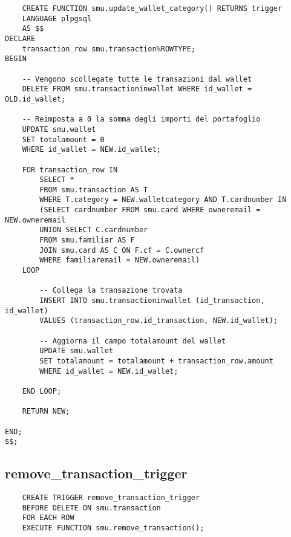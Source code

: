 \begin{lstlisting}
    CREATE FUNCTION smu.update_wallet_category() RETURNS trigger
    LANGUAGE plpgsql
    AS $$
DECLARE
    transaction_row smu.transaction%ROWTYPE;
BEGIN

    -- Vengono scollegate tutte le transazioni dal wallet
    DELETE FROM smu.transactioninwallet WHERE id_wallet = OLD.id_wallet;

    -- Reimposta a 0 la somma degli importi del portafoglio
    UPDATE smu.wallet
    SET totalamount = 0
    WHERE id_wallet = NEW.id_wallet;

    FOR transaction_row IN
        SELECT *
        FROM smu.transaction AS T
        WHERE T.category = NEW.walletcategory AND T.cardnumber IN 
        (SELECT cardnumber FROM smu.card WHERE owneremail = NEW.owneremail
        UNION SELECT C.cardnumber
        FROM smu.familiar AS F
        JOIN smu.card AS C ON F.cf = C.ownercf
        WHERE familiaremail = NEW.owneremail)
    LOOP

        -- Collega la transazione trovata
        INSERT INTO smu.transactioninwallet (id_transaction, id_wallet)
        VALUES (transaction_row.id_transaction, NEW.id_wallet);

        -- Aggiorna il campo totalamount del wallet
        UPDATE smu.wallet
        SET totalamount = totalamount + transaction_row.amount
        WHERE id_wallet = NEW.id_wallet;

    END LOOP;

    RETURN NEW;
    
END;
$$;

\end{lstlisting}

\subsection{remove\_transaction\_trigger}

\begin{lstlisting}
    CREATE TRIGGER remove_transaction_trigger 
    BEFORE DELETE ON smu.transaction 
    FOR EACH ROW 
    EXECUTE FUNCTION smu.remove_transaction();
\end{lstlisting}

